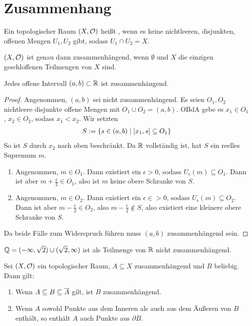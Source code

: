 \documentclass{report}
\begin{document}
\chapter{Zusammenhang}
\begin{definition}
	Ein topologischer Raum $(X, \mathcal{O})$ heißt , wenn es keine nichtleeren, disjunkten, offenen Mengen $U_1, U_2$ gibt, sodass $U_1 \cap U_2 = X$.
\end{definition}
\begin{lemma}
	$(X, \mathcal{O})$ ist genau dann zusammenhängend, wenn $\emptyset$ und $X$ die einzigen geschloffenen Teilmengen von $X$ sind.
\end{lemma}
\begin{theorem}
	Jedes offene Intervall $(a,b) \subset \mathbb{R}$ ist zusammenhängend.
\end{theorem}
\begin{proof}
	Angenommen, $(a,b)$ sei nicht zusammenhängend. Es seien $O_1, O_2$ nichtleere disjunkte offene Mengen mit $O_1 \cup O_2 = (a,b)$. OBdA gebe es $x_1 \in O_1$, $x_2 \in O_2$, sodass $x_1 < x_2$. Wir setzten
	\begin{align*}
		S := \qty{s \in (a,b) \mid [x_1, s] \subseteq O_1}
	\end{align*}
	So ist $S$ durch $x_2$ nach oben beschränkt. Da $\mathbb{R}$ vollständig ist, hat $S$ ein reelles Supremum $m$. 
	\begin{enumerate}
		\item Angenommen, $m \in O_1$. Dann existiert ein $\epsilon > 0$, sodass $U_\epsilon(m) \subseteq O_1$. Dann ist aber $m + \frac{\epsilon}{2} \in O_1$, also ist $m$ keine obere Schranke von $S$.
		\item Angenommen, $m \in O_2$. Dann existiert ein $\epsilon \in > 0$, sodass $U_\epsilon(m) \subseteq O_2$. Dann ist aber $m - \frac{\epsilon}{2} \in O_2$, also $m - \frac{\epsilon}{2} \notin S$, also existiert eine kleinere obere Schranke von $S$.
	\end{enumerate}
	Da beide Fälle zum Widerspruch führen muss $(a,b)$ zusammenhängend sein.
\end{proof}
\begin{corollary}
	$\mathbb{Q} = (-\infty, \sqrt{2}) \cup (\sqrt{2}, \infty)$ ist als Teilmenge von $\mathbb{R}$ nicht zusammenhängend.
\end{corollary}
\pagebreak
\begin{theorem}
	Sei $(X, \mathcal{O})$ ein topologischer Raum, $A \subseteq X$ zusammenhängend und $B$ beliebig. Dann gilt:
	\begin{enumerate}
		\item Wenn $A \subseteq B \subseteq \overline{{A}}$ gilt, ist $B$ zusammenhängend.
		\item Wenn $A$ sowohl Punkte aus dem Inneren als auch aus dem Äußeren von $B$ enthält, so enthält $A$ auch Punkte aus $\partial B$.
	\end{enumerate}
\end{theorem}
\end{document}
